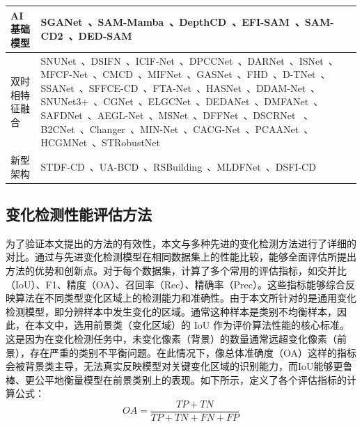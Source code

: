 \begin{table}
\begin{tabularx}{\textheight}{@{}l X@{}}
\midrule
AI 基础模型 & SGANet~\cite{j_chen_sganet_2025}、SAM-Mamba~\cite{Li2025SAMMambaATC}、DepthCD~\cite{Zhou2025DepthCDDP}、EFI-SAM~\cite{Huang2025SAMBasedEF}、SAM-CD2~\cite{Sun2024SegmentAM}、DED-SAM~\cite{Qiu2025DEDSAMAdaptingSA}\\
\midrule
双时相特征融合 & SNUNet~\cite{Fang2021SNUNetCDAD}、DSIFN~\cite{Zhang2020ADS}、ICIF-Net~\cite{Feng2022ICIFNetIC}、DPCCNet~\cite{Papadomanolaki2021ADM}、DARNet~\cite{li_densely_2022}、ISNet~\cite{Cheng2022ISNetTI}、MFCF-Net~\cite{b_huang_remote-sensing_2024}、CMCD~\cite{li_cmcd_2025}、MIFNet~\cite{w_xie_mifnet_2025}、GASNet~\cite{zhang_global-aware_2023}、FHD~\cite{pei_feature_2022}、D-TNet~\cite{wan_d-tnet_2022-3}、SSANet~\cite{Jiang2022JointVL}、SFFCE-CD~\cite{y_xing_sffce-cd_2025}、FTA-Net~\cite{t_zhu_fta-net_2025}、HASNet~\cite{c_tao_hasnet_2025}、DDAM-Net~\cite{feng_ddam-net_2024}、SNUNet3+~\cite{miao_snunet3_2024}、CGNet~\cite{han_change_2023}、ELGCNet~\cite{m_noman_elgc-net_2024}、DEDANet~\cite{Li2025DifferenceEA}、DMFANet~\cite{Zhan2025DifferenceAwareMF}、SAFDNet~\cite{Fu2025BeyondCD}、AEGL-Net~\cite{Ying2025AEGLNetAM}、MSNet~\cite{Liu2025NetworkAD}、DFFNet~\cite{Liu2025FullScaleCD}、DSCRNet ~\cite{Zhang2025ADS}、B2CNet~\cite{Zhang2024B2CNetAP}、Changer~\cite{Fang2022ChangerFI}、MIN-Net~\cite{Zhou2024MultistageIN}、CACG-Net~\cite{Liu2024CandidateAwareAC}、PCAANet~\cite{Xu2023ProgressiveCA}、HCGMNet~\cite{Han2023HCGMNetAH}、STRobustNet~\cite{Zhang2025STRobustNetEC}\\
\midrule
新型架构 & STDF-CD~\cite{y_zhou_stdf_2025}、UA-BCD~\cite{li_overcoming_2025}、RSBuilding~\cite{wang_rsbuilding_2024}、MLDFNet~\cite{d_sidekejiang_mldfnet_2025}、DSFI-CD~\cite{x_li_dsfi-cd_2025}\\
\bottomrule
\end{tabularx}
\end{table}

\subsection{变化检测性能评估方法}
为了验证本文提出的方法的有效性，本文与多种先进的变化检测方法进行了详细的对比。通过与先进变化检测模型在相同数据集上的性能比较，能够全面评估所提出方法的优势和创新点。对于每个数据集，计算了多个常用的评估指标，如交并比（IoU）、F1、精度（OA）、召回率（Rec）、精确率（Prec）。这些指标能够综合反映算法在不同类型变化区域上的检测能力和准确性。由于本文所针对的是通用变化检测模型，即分辨样本中发生变化的区域。通常这种样本是类别不均衡样本，因此，在本文中，选用前景类（变化区域）的 IoU 作为评价算法性能的核心标准。这是因为在变化检测任务中，未变化像素（背景）的数量通常远超变化像素（前景），存在严重的类别不平衡问题。在此情况下，像总体准确度（OA）这样的指标会被背景类主导，无法真实反映模型对关键变化区域的识别能力，而IoU能够更鲁棒、更公平地衡量模型在前景类别上的表现。如下所示，定义了各个评估指标的计算公式：
\begin{equation}
OA = \frac{TP + TN}{TP + TN + FN + FP}
\end{equation}

